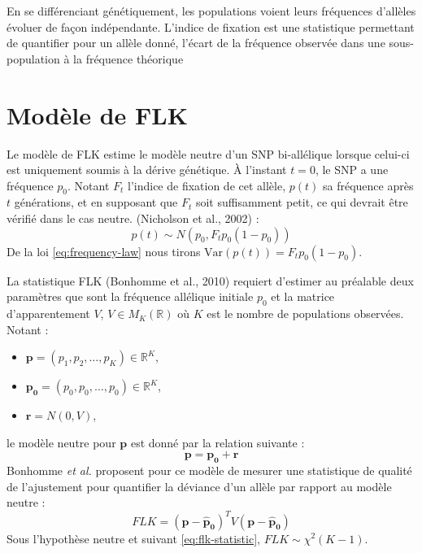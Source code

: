 \documentclass[12pt,twoside]{ugathesis}
\begin{document}
En se différenciant génétiquement, les populations voient leurs
fréquences d'allèles évoluer de façon indépendante. L'indice de fixation
est une statistique permettant de quantifier pour un allèle donné,
l'écart de la fréquence observée dans une sous-population à la fréquence
théorique

\section{Modèle de FLK}\label{modele-de-flk}

Le modèle de FLK estime le modèle neutre d'un SNP bi-allélique lorsque
celui-ci est uniquement soumis à la dérive génétique. À l'instant
\(t = 0\), le SNP a une fréquence \(p_0\). Notant \(F_t\) l'indice de
fixation de cet allèle, \(p(t)\) sa fréquence après \(t\) générations,
et en supposant que \(F_t\) soit suffisamment petit, ce qui devrait être
vérifié dans le cas neutre. (Nicholson et al., 2002) :
\begin{equation} 
  p(t) \sim N(p_0, F_t p_0 (1-p_0)) 
  \label{eq:frequency-law}
\end{equation}
De la loi \eqref{eq:frequency-law} nous tirons
\(\text{Var}(p(t)) = F_t p_0 (1-p_0)\).

La statistique FLK (Bonhomme et al., 2010) requiert d'estimer au
préalable deux paramètres que sont la fréquence allélique initiale
\(p_0\) et la matrice d'apparentement \(V\), \(V \in M_K(\mathbb{R})\)
où \(K\) est le nombre de populations observées. Notant :
\begin{itemize}
\item
  \(\boldsymbol{p} = (p_1, p_2, \dots, p_K) \in \mathbb{R}^K\),
\item
  \(\boldsymbol{p_0} = (p_0, p_0, \dots, p_0) \in \mathbb{R}^K\),
\item
  \(\boldsymbol{r} = N(0, V)\),
\end{itemize}
le modèle neutre pour \(\boldsymbol{p}\) est donné par la relation
suivante :
\begin{equation} 
  \boldsymbol{p} = \boldsymbol{p_0} + \boldsymbol{r} 
  \label{eq:flk_neutral_model}
\end{equation}
Bonhomme \textit{et al.} proposent pour ce modèle de mesurer une
statistique de qualité de l'ajustement pour quantifier la déviance d'un
allèle par rapport au modèle neutre :
\begin{equation} 
  FLK = (\boldsymbol{p - \hat{p}_0})^T V (\boldsymbol{p - \hat{p}_0})                                \label{eq:flk-statistic}
\end{equation}
Sous l'hypothèse neutre et suivant \eqref{eq:flk-statistic},
\(FLK \sim \chi^2 (K - 1)\).
\end{document}
